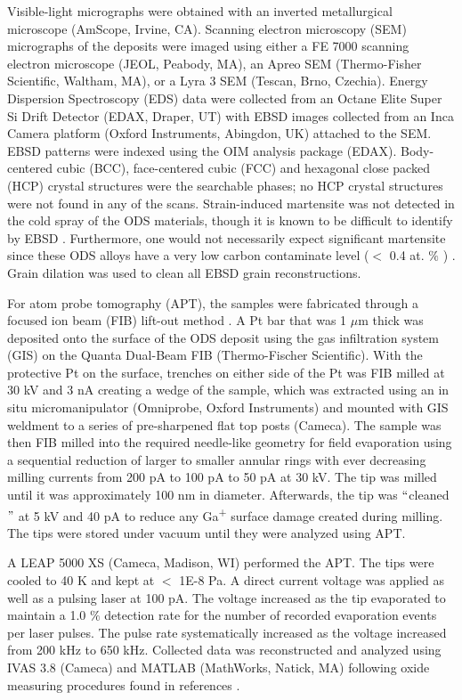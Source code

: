 	
	
		Visible-light micrographs were obtained with an inverted metallurgical microscope (AmScope, Irvine, CA). Scanning electron microscopy (SEM) micrographs of the deposits were imaged using either a FE 7000 scanning electron microscope (JEOL, Peabody, MA), an Apreo SEM (Thermo-Fisher Scientific, Waltham, MA), or a Lyra 3 SEM (Tescan, Brno, Czechia). Energy Dispersion Spectroscopy (EDS) data were collected from an Octane Elite Super Si Drift Detector (EDAX, Draper, UT) with EBSD images collected from an Inca Camera platform (Oxford Instruments, Abingdon, UK) attached to the SEM. EBSD patterns were indexed using the OIM analysis package (EDAX). Body-centered cubic (BCC), face-centered cubic (FCC) and hexagonal close packed (HCP) crystal structures were the searchable phases; no HCP crystal structures were not found in any of the scans. Strain-induced martensite was not detected in the cold spray of the ODS materials, though it is known to be difficult to identify by EBSD \cite{RN3446}. Furthermore, one would not necessarily expect significant martensite since these ODS alloys have a very low carbon contaminate level ($<$ 0.4 at. $\%$ ) \cite{RN267}. Grain dilation was used to clean all EBSD grain reconstructions. 
	
	
	
		 For atom probe tomography (APT), the samples were fabricated through a focused ion beam (FIB) lift-out method \cite{RN347}. A Pt bar that was 1  $ \mu $m thick was deposited onto the surface of the ODS deposit using the gas infiltration system (GIS) on the Quanta Dual-Beam FIB (Thermo-Fischer Scientific). With the protective Pt on the surface, trenches on either side of the Pt was FIB milled at 30 kV and 3 nA creating a wedge of the sample, which was extracted using an in situ micromanipulator (Omniprobe, Oxford Instruments) and mounted with GIS weldment to a series of pre-sharpened flat top posts (Cameca). The sample was then FIB milled into the required needle-like geometry for field evaporation using a sequential reduction of larger to smaller annular rings with ever decreasing milling currents from 200 pA to 100 pA to 50 pA at 30 kV. The tip was milled until it was approximately 100 nm in diameter. Afterwards, the tip was $``$cleaned$"$  at 5 kV and 40 pA to reduce any Ga\textsuperscript{+} surface damage created during milling. The tips were stored under vacuum until they were analyzed using APT.
	
	
	
		 A LEAP 5000 XS (Cameca, Madison, WI) performed the APT. The tips were cooled to 40 K and kept at $<$ 1E-8 Pa. A direct current voltage was applied as well as a pulsing laser at 100 pA. The voltage increased as the tip evaporated to maintain a 1.0 $\%$  detection rate for the number of recorded evaporation events per laser pulses. The pulse rate systematically increased as the voltage increased from 200 kHz to 650 kHz. Collected data was reconstructed and analyzed using IVAS 3.8 (Cameca) and MATLAB (MathWorks, Natick, MA) following oxide measuring procedures found in references \cite{RN1023,RN2626}. 


